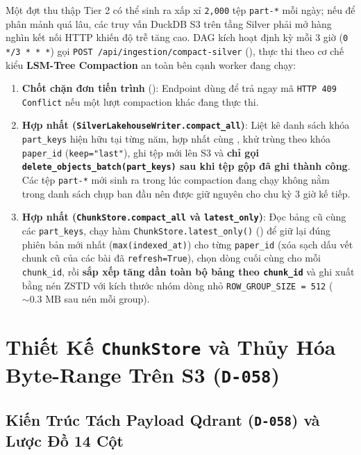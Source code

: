 Một đợt thu thập Tier 2 có thể sinh ra xấp xỉ \texttt{2,000} tệp \texttt{part-*} mỗi ngày; nếu để phân mảnh quá lâu, các truy vấn DuckDB S3 trên tầng Silver phải mở hàng nghìn kết nối HTTP khiến độ trễ tăng cao. DAG  kích hoạt định kỳ mỗi 3 giờ (\texttt{0 */3 * * *}) gọi \texttt{POST /api/ingestion/compact-silver} (), thực thi theo cơ chế kiểu \textbf{LSM-Tree Compaction} an toàn bên cạnh worker đang chạy:
\begin{enumerate}[label=\textbf{\arabic*.}]
  \item \textbf{Chốt chặn đơn tiến trình} (): Endpoint dùng  để trả ngay mã \texttt{HTTP 409 Conflict} nếu một lượt compaction khác đang thực thi.
  \item \textbf{Hợp nhất  (\texttt{SilverLakehouseWriter.compact\_all})}: Liệt kê danh sách khóa \texttt{part\_keys} hiện hữu tại từng năm, hợp nhất cùng , khử trùng theo khóa \texttt{paper\_id} (\texttt{keep="last"}), ghi tệp mới lên S3 và \textbf{chỉ gọi \texttt{delete\_objects\_batch(part\_keys)} sau khi tệp gộp đã ghi thành công}. Các tệp \texttt{part-*} mới sinh ra trong lúc compaction đang chạy không nằm trong danh sách chụp ban đầu nên được giữ nguyên cho chu kỳ 3 giờ kế tiếp.
  \item \textbf{Hợp nhất  (\texttt{ChunkStore.compact\_all} và \texttt{latest\_only})}: Đọc bảng cũ cùng các \texttt{part\_keys}, chạy hàm \texttt{ChunkStore.latest\_only()} () để giữ lại đúng phiên bản mới nhất (\texttt{max(indexed\_at)}) cho từng \texttt{paper\_id} (xóa sạch dấu vết chunk cũ của các bài đã \texttt{refresh=True}), chọn dòng cuối cùng cho mỗi \texttt{chunk\_id}, rồi \textbf{sắp xếp tăng dần toàn bộ bảng theo \texttt{chunk\_id}} và ghi xuất bằng nén ZSTD với kích thước nhóm dòng nhỏ \texttt{ROW\_GROUP\_SIZE = 512} ($\sim 0.3\text{ MB}$ sau nén mỗi group).
\end{enumerate}

\section{Thiết Kế \texttt{ChunkStore} và Thủy Hóa Byte-Range Trên S3 (\texttt{D-058})}
\label{sec:ch2_chunkstore}

\subsection{Kiến Trúc Tách Payload Qdrant (\texttt{D-058}) và Lược Đồ 14 Cột}
\label{sec:ch2_d058}

